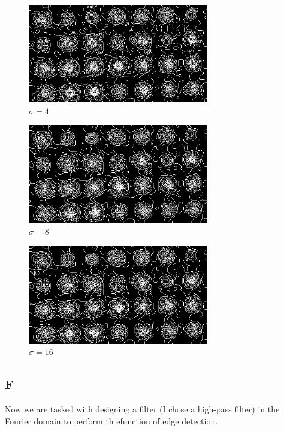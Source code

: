 \documentclass{article}
\begin{document}
\begin{figure}[H]
    \centering
    \includegraphics[width = 0.7\textwidth]{imgs/mh-4.jpg}
    \caption{$\sigma = 4$}
    \label{fig:mh-4}
\end{figure}

\begin{figure}[H]
    \centering
    \includegraphics[width = 0.7\textwidth]{imgs/mh-8.jpg}
    \caption{$\sigma = 8$}
    \label{fig:mh-8}
\end{figure}

\begin{figure}[H]
    \centering
    \includegraphics[width = 0.7\textwidth]{imgs/mh-16.jpg}
    \caption{$\sigma = 16$}
    \label{fig:mh-16}
\end{figure}

\subsection*{F}

Now we are tasked with designing a filter (I chose a high-pass filter) in the Fourier domain to perform th efunction of edge detection.
\end{document}
